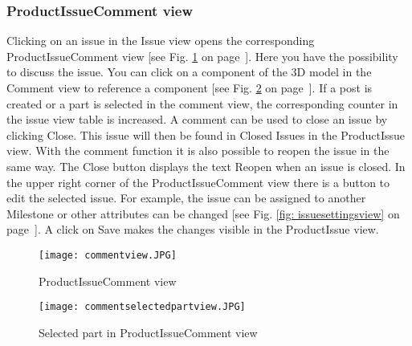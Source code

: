     \subsubsection*{ProductIssueComment view}
    Clicking on an issue in the Issue view opens the corresponding ProductIssueComment view [see Fig. \ref{fig: commentview} on page~\pageref{fig: commentview}]. Here you have the possibility to discuss the issue. You can click on a component of the 3D model in the Comment view to reference a component [see Fig. \ref{fig: commentselectedpartview} on page~\pageref{fig: commentselectedpartview}]. If a post is created or a part is selected in the comment view, the corresponding counter in the issue view table is increased. A comment can be used to close an issue by clicking Close. This issue will then be found in Closed Issues in the ProductIssue view. With the comment function it is also possible to reopen the issue in the same way. The Close button displays the text Reopen when an issue is closed. In the upper right corner of the ProductIssueComment view there is a button to edit the selected issue. For example, the issue can be assigned to another Milestone or other attributes can be changed [see Fig. \ref{fig: issuesettingsview} on page~\pageref{fig: issuesettingsview}]. A click on Save makes the changes visible in the ProductIssue view.

    \begin{figure}[h]
        \centering
        \texttt{[image: commentview.JPG]}
        \caption{ProductIssueComment view}
        \label{fig: commentview}
    \end{figure}

    \begin{figure}[h]
        \centering
        \texttt{[image: commentselectedpartview.JPG]}
        \caption{Selected part in ProductIssueComment view}
        \label{fig: commentselectedpartview}
    \end{figure}

